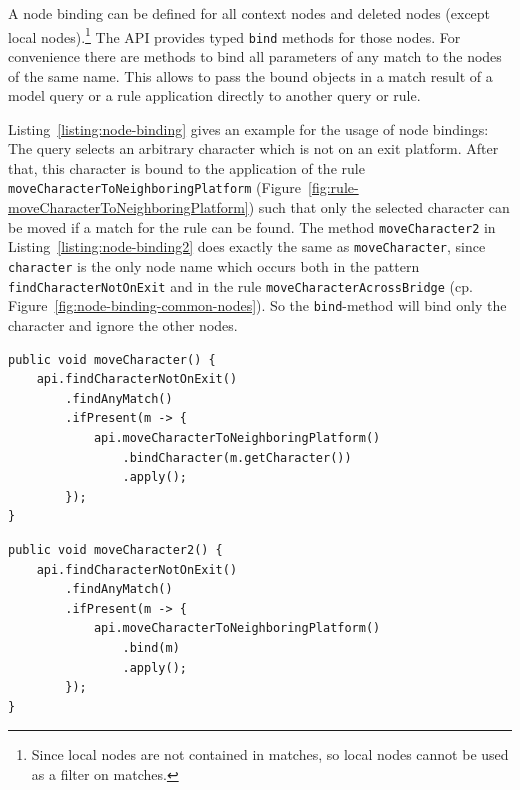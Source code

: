 A node binding can be defined for all context nodes and deleted nodes (except local nodes).\footnote{Since local nodes are not contained in matches, so local nodes cannot be used as a filter on matches.}
The API provides typed \texttt{bind} methods for those nodes.
For convenience there are methods to bind all parameters of any match to the nodes of the same name.
This allows to pass the bound objects in a match result of a model query or a rule application directly to another query or rule.

Listing~\ref{listing:node-binding} gives an example for the usage of node bindings:
The query selects an arbitrary character which is not on an exit platform.
After that, this character is bound to the application of the rule \texttt{moveCharacterToNeighboringPlatform} (Figure~\ref{fig:rule-moveCharacterToNeighboringPlatform}) such that only the selected character can be moved if a match for the rule can be found.
The method \texttt{moveCharacter2} in Listing~\ref{listing:node-binding2} does exactly the same as \texttt{moveCharacter}, since \texttt{character} is the only node name which occurs both in the pattern \texttt{findCharacterNotOnExit} and in the rule \texttt{moveCharacterAcrossBridge} (cp. Figure~\ref{fig:node-binding-common-nodes}).
So the \texttt{bind}-method will bind only the character and ignore the other nodes.

\begin{lstlisting}[caption={Node Binding}, label={listing:node-binding}]
public void moveCharacter() {
	api.findCharacterNotOnExit()
		.findAnyMatch()
		.ifPresent(m -> {
			api.moveCharacterToNeighboringPlatform()
				.bindCharacter(m.getCharacter())
				.apply();
		});
}
\end{lstlisting}

\begin{lstlisting}[caption={Node Binding based on Naming Convention}, label={listing:node-binding2}]
public void moveCharacter2() {
	api.findCharacterNotOnExit()
		.findAnyMatch()
		.ifPresent(m -> {
			api.moveCharacterToNeighboringPlatform()
				.bind(m)
				.apply();
		});
}
\end{lstlisting}

